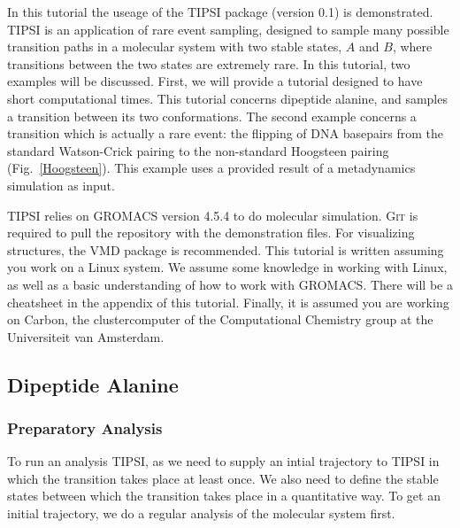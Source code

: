 \documentclass[]{article}
\begin{document}

In this tutorial the useage of the \textsc{TIPSI} package (version 0.1) is demonstrated. \textsc{TIPSI} is an application of rare event sampling, designed to sample many possible transition paths in a molecular system with two stable states, $A$ and $B$, where transitions between the two states are extremely rare. In this tutorial, two examples will be discussed. First, we will provide a tutorial designed to have short computational times. This tutorial concerns dipeptide alanine, and samples a transition between its two conformations. The second example concerns a transition which is actually a rare event: the flipping of DNA basepairs from the standard Watson-Crick pairing to the non-standard Hoogsteen pairing (Fig.~\ref{Hoogsteen}). This example uses a provided result of a metadynamics simulation as input. 

\textsc{TIPSI} relies on \textsc{GROMACS} version 4.5.4 to do molecular simulation. \textsc{Git} is required to pull the repository with the demonstration files. For visualizing structures, the VMD package is recommended. This tutorial is written assuming you work on a Linux system. We assume some knowledge in working with Linux, as well as a basic understanding of how to work with \textsc{GROMACS}. There will be a cheatsheet in the appendix of this tutorial. Finally, it is assumed you are working on Carbon, the clustercomputer of the Computational Chemistry group at the Universiteit van Amsterdam.

\subsection*{Dipeptide Alanine}

\subsubsection*{Preparatory Analysis}

To run an analysis \textsc{TIPSI}, as we need to supply an intial trajectory to \textsc{TIPSI} in which the transition takes place at least once. We also need to define the stable states between which the transition takes place in a quantitative way. To get an initial trajectory, we do a regular analysis of the molecular system first.
\end{document}
